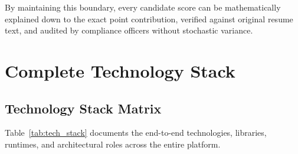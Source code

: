 \documentclass[11pt,a4paper]{report}
\begin{document}
\noindent By maintaining this boundary, every candidate score can be mathematically explained down to the exact point contribution, verified against original resume text, and audited by compliance officers without stochastic variance.

\chapter{Complete Technology Stack}

\section{Technology Stack Matrix}
Table~\ref{tab:tech_stack} documents the end-to-end technologies, libraries, runtimes, and architectural roles across the entire platform.
\end{document}
